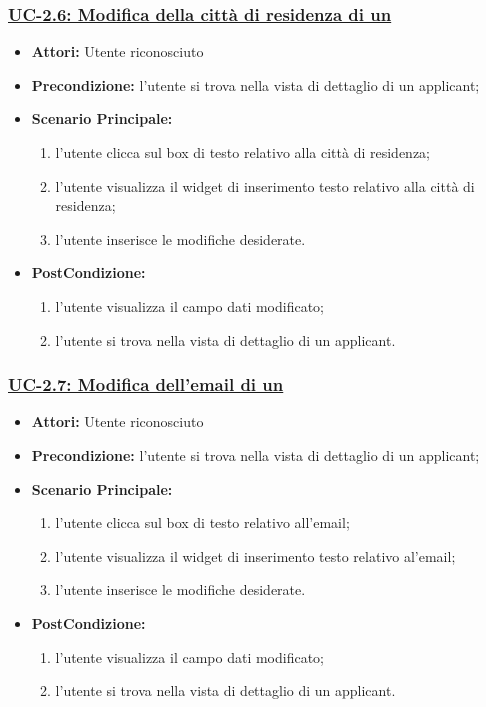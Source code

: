 \subsubsection{\underline{UC-2.6: Modifica della città di residenza di un \applicant}}
\begin{itemize}
	\item \textbf{Attori:} Utente riconosciuto
	\item \textbf{Precondizione:}  l'utente si trova nella vista di dettaglio di un applicant;
	\item \textbf{Scenario Principale:}
	\begin{enumerate}
		\item l'utente clicca sul box di testo relativo alla città di residenza;
		\item l'utente visualizza il  widget di inserimento testo relativo alla città di residenza;
		\item l'utente inserisce le modifiche desiderate.
	\end{enumerate}
	\item \textbf{PostCondizione:} 
	\begin{enumerate}
		\item l'utente visualizza il campo dati modificato;
		\item l'utente si trova nella vista di dettaglio di un applicant.
	\end{enumerate}
	
\end{itemize}

\subsubsection{\underline{UC-2.7: Modifica dell'email di un \applicant}}
\begin{itemize}
	\item \textbf{Attori:} Utente riconosciuto
	\item \textbf{Precondizione:}  l'utente si trova nella vista di dettaglio di un applicant;
	\item \textbf{Scenario Principale:}
	\begin{enumerate}
		\item l'utente clicca sul box di testo relativo all'email;
		\item l'utente visualizza il  widget di inserimento testo relativo al'email;
		\item l'utente inserisce le modifiche desiderate.
	\end{enumerate}
	\item \textbf{PostCondizione:} 
	\begin{enumerate}
		\item l'utente visualizza il campo dati modificato;
		\item l'utente si trova nella vista di dettaglio di un applicant.
	\end{enumerate}
	
\end{itemize}


